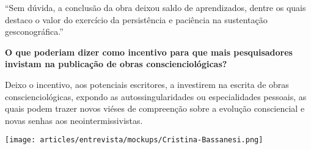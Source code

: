 \documentclass{gescons}
\begin{document}
\begin{multicols}{2}
\begin{pullquote}
``Sem dúvida, a conclusão da obra deixou saldo de aprendizados, dentre os quais destaco o valor do exercício da persistência e paciência na sustentação gesconográfica.''
\end{pullquote}

\textbf{O que poderiam dizer como incentivo para que mais pesquisadores invistam na publicação de obras conscienciológicas?}

Deixo o incentivo, aos potenciais escritores, a investirem na escrita de obras conscienciológicas, expondo as autossingularidades ou especialidades pessoais, as quais podem trazer novos viéses de compreenção sobre a evolução consciencial e novas senhas aos neointermissivistas. 


\begin{center}
    \texttt{[image: articles/entrevista/mockups/Cristina-Bassanesi.png]}
\end{center}
    
    \end{multicols}
\end{document}
